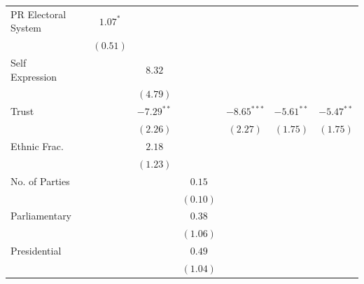 \documentclass[a4paper]{article}\usepackage{graphicx, color}
\begin{document}
\begin{table}
\begin{center}
\begin{tabular}{l c c c c c c c }
PR Electoral System      &               & $1.07^{*}$    &               &               &               &                    &                   \\
                         &               & $(0.51)$      &               &               &               &                    &                   \\
Self Expression          &               &               & $8.32$        &               &               &                    &                   \\
                         &               &               & $(4.79)$      &               &               &                    &                   \\
Trust                    &               &               & $-7.29^{**}$  &               & $-8.65^{***}$ & $-5.61^{**}$       & $-5.47^{**}$      \\
                         &               &               & $(2.26)$      &               & $(2.27)$      & $(1.75)$           & $(1.75)$          \\
Ethnic Frac.             &               &               & $2.18$        &               &               &                    &                   \\
                         &               &               & $(1.23)$      &               &               &                    &                   \\
No. of Parties           &               &               &               & $0.15$        &               &                    &                   \\
                         &               &               &               & $(0.10)$      &               &                    &                   \\
Parliamentary            &               &               &               & $0.38$        &               &                    &                   \\
                         &               &               &               & $(1.06)$      &               &                    &                   \\
Presidential             &               &               &               & $0.49$        &               &                    &                   \\
                         &               &               &               & $(1.04)$      &               &                    &                   \\

\end{tabular}
\end{center}
\end{table}
\end{document}
